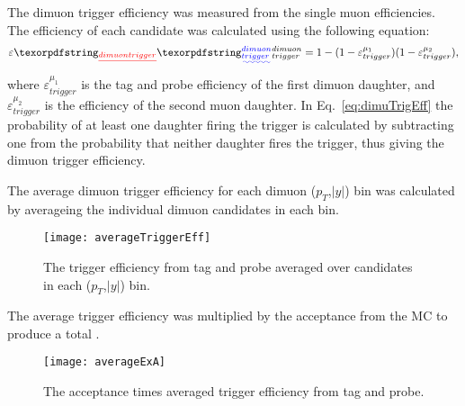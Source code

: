       The dimuon trigger efficiency \DIFdelbegin {}\DIFdelend \DIFaddbegin {}\DIFaddend was measured
        from the single muon efficiencies. 
      The efficiency of each candidate was calculated using the following
        equation:
      \begin{equation}
        \label{eq:dimuTrigEff}
        \varepsilon\DIFdelbegin \DIFdel{_{dimuon trigger}}\DIFdelend \DIFaddbegin \DIFadd{^{dimuon}_{trigger}}\DIFaddend =1-(1-\varepsilon_{trigger}^{\mu_{1}})(1-\varepsilon_{trigger}^{\mu_{2}}),
      \end{equation}
      where $\varepsilon_{trigger}^{\mu_{1}}$ is the tag and probe efficiency
        of the first dimuon daughter, and $\varepsilon_{trigger}^{\mu_{2}}$ is
        the efficiency of the second muon daughter. 
      In Eq.~\ref{eq:dimuTrigEff} the probability of at least one daughter
        firing the trigger is calculated by subtracting one from the
        probability that neither daughter fires the trigger,
        thus giving the dimuon trigger efficiency. 

      The average dimuon trigger efficiency for each dimuon ($p_{T}$,$|y|$) bin
        was calculated by averageing the individual dimuon candidates in each
        bin. 
      \begin{figure}[!Hhbt]
        \centering
        \texttt{[image: averageTriggerEff]}
        \caption{The trigger efficiency from tag and probe averaged over candidates
          in each ($p_{T}$,$|y|$) bin.}
        \label{fig:avTrigEffCo}
      \end{figure}
      The average trigger efficiency was multiplied by the acceptance from the MC 
        to produce a total \DIFdelbegin {}\DIFdelend \DIFaddbegin {}\DIFaddend . 
      \begin{figure}[!Hhtb]
        \centering
        \texttt{[image: averageExA]}
        \caption{The acceptance times averaged trigger efficiency from tag and 
          probe.}
        \label{fig:avAccEff}
      \end{figure}

      \DIFaddbegin {}


